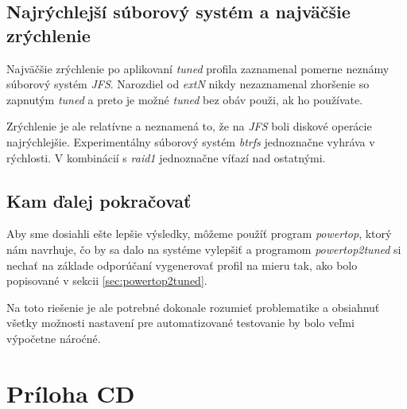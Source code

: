 \section{Najrýchlejší súborový systém a najväčšie zrýchlenie}

Najväčšie zrýchlenie po aplikovaní \emph{tuned} profila zaznamenal pomerne
neznámy súborový systém \emph{JFS}. Narozdiel od \emph{extN} nikdy nezaznamenal
zhoršenie so zapnutým \emph{tuned} a preto je možné \emph{tuned} bez obáv
použi, ak ho používate.

Zrýchlenie je ale relatívne a neznamená to, že na \emph{JFS} boli diskové
operácie najrýchlejšie. Experimentálny súborový systém \emph{btrfs} jednoznačne
vyhráva v rýchlosti. V kombinácií s \emph{raid1} jednoznačne víťazí nad
ostatnými.

\section{Kam ďalej pokračovať}

Aby sme dosiahli ešte lepšie výsledky, môžeme použíť program \emph{powertop},
ktorý nám navrhuje, čo by sa dalo na systéme vylepšiť a programom
\emph{powertop2tuned} si nechať na základe odporúčaní vygenerovať profil na
mieru tak, ako bolo popisované v sekcii \ref{sec:powertop2tuned}.

Na toto riešenie je ale potrebné dokonale rozumieť problematike a obsiahnuť
všetky možnosti nastavení pre automatizované testovanie by bolo veľmi výpočetne
nároćné.

%
%

\setcounter{chapter}{0}
\renewcommand{\thechapter}{\Alph{chapter}}
\chapter{Príloha CD}

